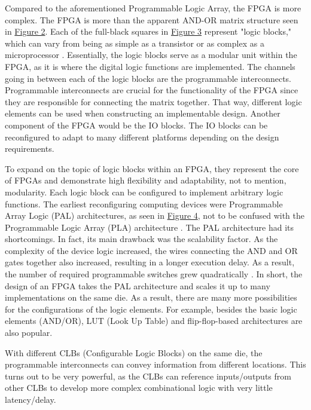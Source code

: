 \documentclass[12pt]{article}
\begin{document}
        Compared to the aforementioned Programmable Logic Array, the FPGA is more
        complex. The FPGA is more than the apparent AND-OR matrix structure seen in
        \hyperref[pla_matrix]{Figure 2}. Each of the full-black squares in 
        \hyperref[fpga_city]{Figure 3} represent "logic blocks," which can vary 
        from being as simple as a transistor or as complex as a microprocessor 
        \autocite[1013]{231340}. Essentially, the logic blocks serve as a modular 
        unit within the FPGA, as it is where the digital logic functions are 
        implemented. The channels going in between each of the logic blocks are
        the programmable interconnects. Programmable interconnects are crucial for
        the functionality of the FPGA since they are responsible for connecting the
        matrix together. That way, different logic elements can be used when 
        constructing an implementable design. Another component of the FPGA would
        be the IO blocks. The IO blocks can be reconfigured to adapt to many
        different platforms depending on the design requirements.

        To expand on the topic of logic blocks within an FPGA, they represent the
        core of FPGAs and demonstrate high flexibility and adaptability, not to 
        mention, modularity. Each logic block can be configured to implement 
        arbitrary logic functions. The earliest reconfiguring computing devices were
        Programmable Array Logic (PAL) architectures, as seen in 
        \hyperref[pal_matrix]{Figure 4}, not to be confused with the 
        Programmable Logic Array (PLA) architecture \autocite[8]{Boutros2022}. The
        PAL architecture had its shortcomings. In fact, its main drawback was the 
        scalability factor. As the complexity of the device logic increased, the 
        wires connecting the AND and OR gates together also increased, resulting in 
        a longer execution delay. As a result, the number of required programmable 
        switches grew quadratically \autocite[8]{Boutros2022}. In short, the design 
        of an FPGA takes the PAL architecture and scales it up to many 
        implementations on the same die. As a result, there are many more 
        possibilities for the configurations of the logic elements. For example, 
        besides the basic logic elements (AND/OR), LUT (Look Up Table) and 
        flip-flop-based architectures are also popular.

        With different CLBs (Configurable Logic Blocks) on the same die, the 
        programmable interconnects can convey information from different
        locations. This turns out to be very powerful, as the CLBs can reference 
        inputs/outputs from other CLBs to develop more complex combinational logic 
        with very little latency/delay. 
\end{document}
